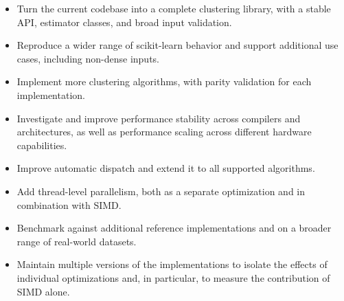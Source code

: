\documentclass[11pt,a4paper]{article}
\begin{document}
\begin{itemize}
    \item Turn the current codebase into a complete clustering library, with a stable API, estimator classes, and broad input validation.
    
    \item Reproduce a wider range of scikit-learn behavior and support additional use cases, including non-dense inputs.
    
    \item Implement more clustering algorithms, with parity validation for each implementation.
    
    \item Investigate and improve performance stability across compilers and architectures, as well as performance scaling across different hardware capabilities.
    
    \item Improve automatic dispatch and extend it to all supported algorithms.
    
    \item Add thread-level parallelism, both as a separate optimization and in combination with SIMD.
    
    \item Benchmark against additional reference implementations and on a broader range of real-world datasets.
    
    \item Maintain multiple versions of the implementations to isolate the effects of individual optimizations and, in particular, to measure the contribution of SIMD alone.
\end{itemize}
\end{document}
